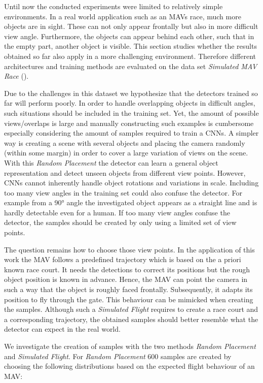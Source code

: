 Until now the conducted experiments were limited to relatively simple environments. In a real world application such as an \acp{MAV} race, much more objects are in sight. These can not only appear frontally but also in more difficult view angle. Furthermore, the objects can appear behind each other, such that in the empty part, another object is visible. This section studies whether the results obtained so far also apply in a more challenging environment. Therefore different architectures and training methods are evaluated on the data set \textit{Simulated MAV Race} ().

Due to the challenges in this dataset we hypothesize that the detectors trained so far will perform poorly. In order to handle overlapping objects in difficult angles, such situations should be included in the training set. Yet, the amount of possible views/overlaps is large and manually constructing such examples is cumbersome especially considering the amount of samples required to train a \acp{CNN}. A simpler way is creating a scene with several objects and placing the camera randomly (within some margin) in order to cover a large variation of views on the scene. With this \textit{Random Placement} the detector can learn a general object representation and detect unseen objects from different view points. However, \acp{CNN} cannot inherently handle object rotations and variations in scale. Including too many view angles in the training set could also confuse the detector. For example from a 90° angle the investigated object appears as a straight line and is hardly detectable even for a human. If too many view angles confuse the detector, the samples should be created by only using a limited set of view points.

The question remains how to choose those view points. In the application of this work the \ac{MAV} follows a predefined trajectory which is based on the a priori known race court. It needs the detections to correct its positions but the rough object position is known in advance.
Hence, the \ac{MAV} can point the camera in such a way that the object is roughly faced frontally. Subsequently, it adapts its position to fly through the gate. This behaviour can be mimicked when creating the samples. Although such a \textit{Simulated Flight} requires to create a race court and a corresponding trajectory, the obtained samples should better resemble what the detector can expect in the real world.

We investigate the creation of samples with the two methods \textit{Random Placement} and \textit{Simulated Flight}. For \textit{Random Placement} 600 samples are created by choosing the following distributions based on the expected flight behaviour of an \ac{MAV}:

